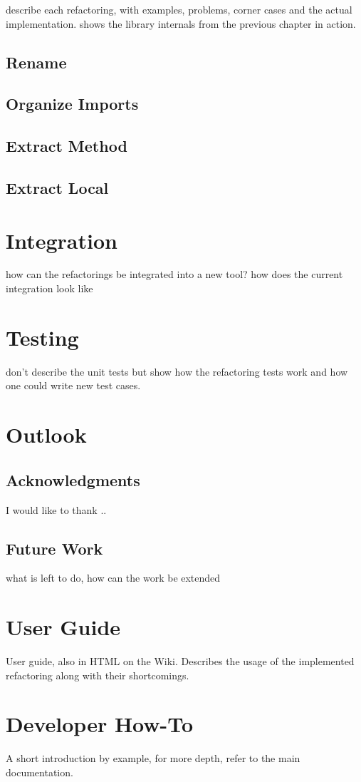 \documentclass[10pt,a4paper,oneside]{scrreprt}
\begin{document}
describe each refactoring, with examples, problems, corner cases and the actual implementation. shows the library internals from the previous chapter in action.

\section{Rename}
\section{Organize Imports}
\section{Extract Method}
\section{Extract Local}


\chapter{Integration}

how can the refactorings be integrated into a new tool?
how does the current integration look like

\chapter{Testing}

don't describe the unit tests but show how the refactoring tests work and how one could write new test cases.

\chapter{Outlook}

\section{Acknowledgments}

I would like to thank ..

\section{Future Work}

what is left to do, how can the work be extended

\appendix

\chapter{User Guide}

User guide, also in HTML on the Wiki. Describes the usage of the implemented refactoring along with their shortcomings.

\chapter{Developer How-To}

A short introduction by example, for more depth, refer to the main documentation.




\clearpage
\bib
\end{document}
